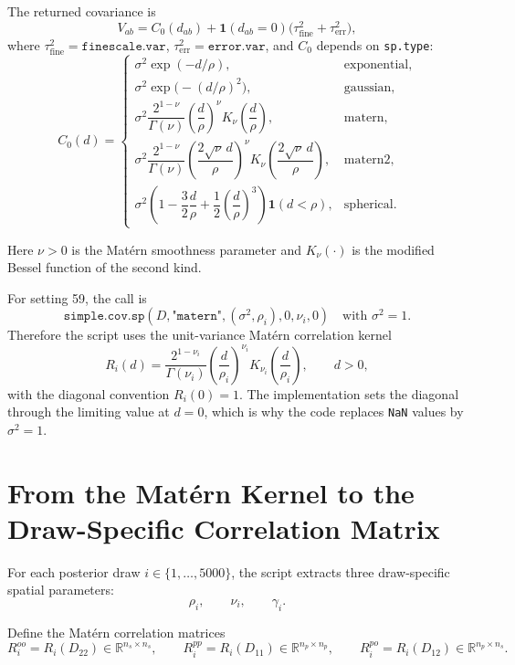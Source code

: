 \documentclass[11pt]{article}
\newcommand{\R}{\mathbb{R}}
\begin{document}
The returned covariance is
\[
V_{ab} = C_0(d_{ab}) + \mathbf{1}(d_{ab} = 0)\bigl(\tau^2_{\text{fine}} +
\tau^2_{\text{err}}\bigr),
\]
where \(\tau^2_{\text{fine}} = \texttt{finescale.var}\),
\(\tau^2_{\text{err}} = \texttt{error.var}\), and \(C_0\) depends on
\texttt{sp.type}:
\[
C_0(d) =
\begin{cases}
\sigma^2 \exp(-d/\rho), & \text{exponential}, \\[4pt]
\sigma^2 \exp\!\bigl(-(d/\rho)^2\bigr), & \text{gaussian}, \\[4pt]
\sigma^2 \dfrac{2^{1-\nu}}{\Gamma(\nu)}
\left(\dfrac{d}{\rho}\right)^\nu
K_\nu\!\left(\dfrac{d}{\rho}\right), & \text{matern}, \\[12pt]
\sigma^2 \dfrac{2^{1-\nu}}{\Gamma(\nu)}
\left(\dfrac{2\sqrt{\nu}\, d}{\rho}\right)^\nu
K_\nu\!\left(\dfrac{2\sqrt{\nu}\, d}{\rho}\right), & \text{matern2}, \\[12pt]
\sigma^2 \left(1 - \dfrac{3}{2}\dfrac{d}{\rho}
+ \dfrac{1}{2}\left(\dfrac{d}{\rho}\right)^3\right)
\mathbf{1}(d < \rho), & \text{spherical}.
\end{cases}
\]

Here \(\nu > 0\) is the Mat\'ern smoothness parameter and \(K_\nu(\cdot)\) is
the modified Bessel function of the second kind.

For setting 59, the call is
\[
\texttt{simple.cov.sp}(D, \texttt{"matern"}, (\sigma^2,\rho_i), 0, \nu_i, 0)
\quad \text{with } \sigma^2 = 1.
\]
Therefore the script uses the unit-variance Mat\'ern correlation kernel
\[
R_i(d)
=
\frac{2^{1-\nu_i}}{\Gamma(\nu_i)}
\left(\frac{d}{\rho_i}\right)^{\nu_i}
K_{\nu_i}\!\left(\frac{d}{\rho_i}\right),
\qquad d > 0,
\]
with the diagonal convention \(R_i(0)=1\). The implementation sets the
diagonal through the limiting value at \(d=0\), which is why the code replaces
\texttt{NaN} values by \(\sigma^2 = 1\).

\section{From the Mat\'ern Kernel to the Draw-Specific Correlation Matrix}

For each posterior draw \(i \in \{1,\dots,5000\}\), the script extracts three
draw-specific spatial parameters:
\[
\rho_i, \qquad \nu_i, \qquad \gamma_i.
\]

Define the Mat\'ern correlation matrices
\[
R^{oo}_i = R_i(D_{22}) \in \R^{n_s \times n_s},
\qquad
R^{pp}_i = R_i(D_{11}) \in \R^{n_p \times n_p},
\qquad
R^{po}_i = R_i(D_{12}) \in \R^{n_p \times n_s}.
\]
\end{document}
